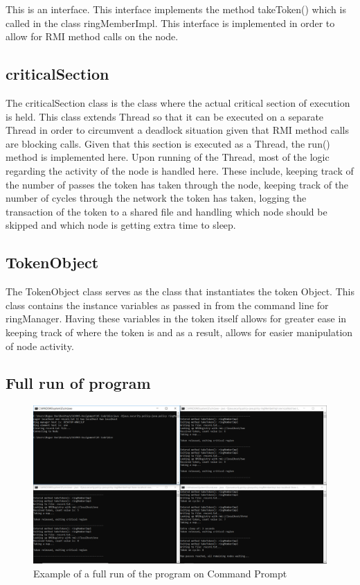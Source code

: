 \documentclass[11pt, a4paper]{article}
\begin{document}
This is an interface. This interface implements the method takeToken() which is called in the class ringMemberImpl. This interface is implemented in order to allow for RMI method calls on the node. 

\subsection{criticalSection}

The criticalSection class is the class where the actual critical section of execution is held. This class extends Thread so that it can be executed on a separate Thread in order to circumvent a deadlock situation given that RMI method calls are blocking calls. Given that this section is executed as a Thread, the run() method is implemented here. Upon running of the Thread, most of the logic regarding the activity of the node is handled here. These include, keeping track of the number of passes the token has taken through the node, keeping track of the number of cycles through the network the token has taken, logging the transaction of the token to a shared file and handling which node should be skipped and which node is getting extra time to sleep. 

\subsection{TokenObject}

The TokenObject class serves as the class that instantiates the token Object. This class contains the instance variables as passed in from the command line for ringManager. Having these variables in the token itself allows for greater ease in keeping track of where the token is and as a result, allows for easier manipulation of node activity.

\subsection{Full run of program}
\begin{figure}[!h]
\centering
\includegraphics[scale=0.4]{full_run}
\caption{Example of a full run of the program on Command Prompt}
\end{figure}
\end{document}
